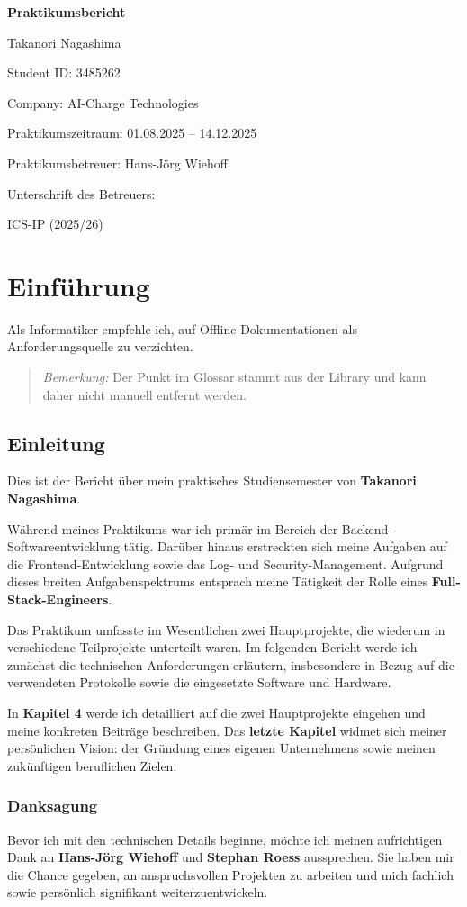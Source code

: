 \documentclass[12pt,a4paper]{report}
\newcommand{\coverpage}[6]{
    \begin{titlepage}
    \centering
    \vspace*{2cm}
    {\LARGE \textbf{Praktikumsbericht} \par}
    \vspace{2cm}
    {\Large #1 \par} %
    \vspace{0.5cm}
    {\Large Student ID: #2 \par}
    \vspace{1cm}
    {\Large Company: #3 \par}
    {\Large Praktikumszeitraum: #4 \par}
    \vspace{2cm}
    {\Large Praktikumsbetreuer: #5 \par}
    \vspace{0.5cm}
    {\Large Unterschrift des Betreuers: #6 \par}
    \vfill
    {\large ICS-IP (2025/26) \par}
    \end{titlepage}
}
\begin{document}
    \coverpage{Takanori Nagashima}{3485262}{AI-Charge Technologies}{01.08.2025 -- 14.12.2025}{Hans-Jörg Wiehoff }{}

    \tableofcontents
    \newpage

    \chapter{Einführung}
    Als Informatiker empfehle ich, auf Offline-Dokumentationen als Anforderungsquelle zu verzichten.

    \begin{quote}
        \textit{Bemerkung:} Der Punkt im Glossar stammt aus der Library und kann daher nicht manuell entfernt werden.
    \end{quote}

    \section{Einleitung}
    Dies ist der Bericht über mein praktisches Studiensemester von \textbf{Takanori Nagashima}. 

    Während meines Praktikums war ich primär im Bereich der Backend-Softwareentwicklung tätig. 
    Darüber hinaus erstreckten sich meine Aufgaben auf die Frontend-Entwicklung sowie das Log- und Security-Management. 
    Aufgrund dieses breiten Aufgabenspektrums entsprach meine Tätigkeit der Rolle eines \textbf{Full-Stack-Engineers}.

    Das Praktikum umfasste im Wesentlichen zwei Hauptprojekte, die wiederum in verschiedene Teilprojekte unterteilt waren. 
    Im folgenden Bericht werde ich zunächst die technischen Anforderungen erläutern, insbesondere in Bezug auf die verwendeten Protokolle sowie die eingesetzte Software und Hardware.

    In \textbf{Kapitel 4} werde ich detailliert auf die zwei Hauptprojekte eingehen und meine konkreten Beiträge beschreiben. 
    Das \textbf{letzte Kapitel} widmet sich meiner persönlichen Vision: der Gründung eines eigenen Unternehmens sowie meinen zukünftigen beruflichen Zielen.

    \subsection*{Danksagung}
        Bevor ich mit den technischen Details beginne, möchte ich meinen aufrichtigen Dank an \textbf{Hans-Jörg Wiehoff} und \textbf{Stephan Roess} aussprechen. 
        Sie haben mir die Chance gegeben, an anspruchsvollen Projekten zu arbeiten und mich fachlich sowie persönlich signifikant weiterzuentwickeln.
\end{document}
